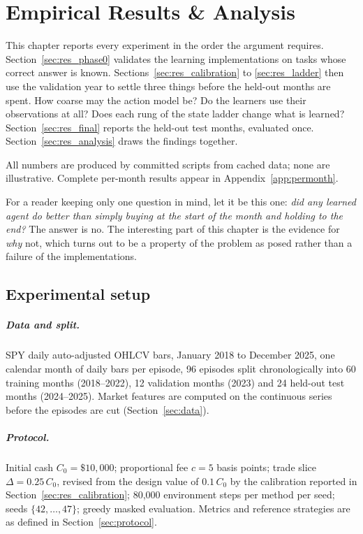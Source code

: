 \chapter{Empirical Results \& Analysis}
\label{ch:results}

This chapter reports every experiment in the order the argument requires.
Section~\ref{sec:res_phase0} validates the learning implementations on
tasks whose correct answer is known. Sections~\ref{sec:res_calibration} to
\ref{sec:res_ladder} then use the validation year to settle three things
before the held-out months are spent. How coarse may the action model be?
Do the learners use their observations at all? Does each rung of the state
ladder change what is learned?
Section~\ref{sec:res_final} reports the held-out test months, evaluated
once. Section~\ref{sec:res_analysis} draws the findings together.

All numbers are produced by committed scripts from cached data; none are
illustrative. Complete per-month results appear in
Appendix~\ref{app:permonth}.

For a reader keeping only one question in mind, let it be this one:
\emph{did any learned agent do better than simply buying at the start of
the month and holding to the end?} The answer is no. The interesting
part of this chapter is the evidence for \emph{why} not, which turns out to
be a property of the problem as posed rather than a failure of the
implementations.

\section{Experimental setup}
\label{sec:res_setup}

\paragraph{Data and split.} SPY daily auto-adjusted OHLCV bars,
January 2018 to December 2025, one calendar month of daily bars per
episode, 96 episodes split chronologically into 60 training months
(2018--2022), 12 validation months (2023) and 24 held-out test months
(2024--2025). Market features are computed on the continuous series before
the episodes are cut (Section~\ref{sec:data}).

\paragraph{Protocol.} Initial cash $C_0 = \$10{,}000$; proportional fee
$c = 5$ basis points; trade slice $\Delta = 0.25\,C_0$, revised from the
design value of $0.1\,C_0$ by the calibration reported in
Section~\ref{sec:res_calibration}; 80{,}000 environment steps per method
per seed; seeds $\{42,\dots,47\}$; greedy masked evaluation. Metrics and
reference strategies are as defined in Section~\ref{sec:protocol}.

